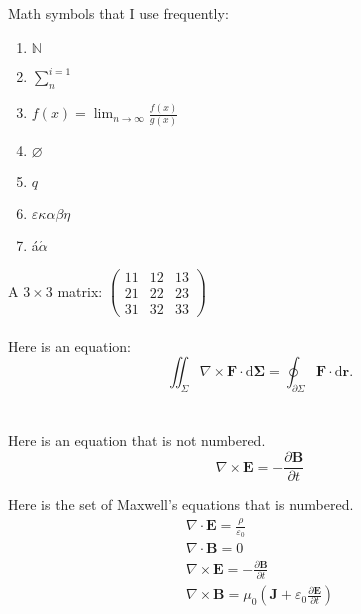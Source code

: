 Math symbols that I use frequently: \vspace{-0.3cm}
\begin{enumerate} \itemsep -4pt
\item $\mathbb{N}$
\item $\displaystyle\sum^{i = 1}_{n}$
\item $f(x) = \displaystyle\lim_{n \rightarrow \infty} \frac{f(x)}{g(x)}$
\item $\varnothing$
\item $q$
\item $\varepsilon\kappa\alpha\beta\eta$
\item {\'{a}}$\acute{\alpha}$
\end{enumerate}

A $3 \times 3$ matrix:
$\left(
\begin{array}{ccc}
	11 & 12 & 13 \\
	21 & 22 & 23 \\
	31 & 32 & 33
\end{array}
\right)$
\ \\
\ \\

Here is an equation:
\begin{equation}
\label{eqn:myeqnexample}
\iint_{\Sigma} \nabla \times \mathbf{F} \cdot \mathrm{d}\mathbf{\Sigma} = \oint_{\partial\Sigma} \mathbf{F} \cdot \mathrm{d} \mathbf{r}.
\end{equation}
\ \\
\ \\

Here is an equation that is not numbered.
\begin{equation*}
\nabla \times \mathbf{E} = -\frac{\partial \mathbf{B}} {\partial t}
\end{equation*}



Here is the set of Maxwell's equations that is numbered.
\begin{gather}
	\nabla \cdot \mathbf{E} = \frac {\rho} {\varepsilon_0} \\
	\nabla \cdot \mathbf{B} = 0 \\
	\nabla \times \mathbf{E} = -\frac{\partial \mathbf{B}} {\partial t} \\
	\nabla \times \mathbf{B} = \mu_0\left(\mathbf{J} + \varepsilon_0 \frac{\partial \mathbf{E}} {\partial t} \right)
\end{gather}


